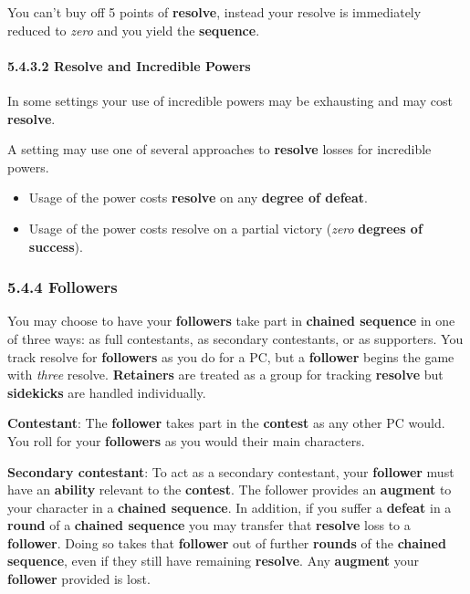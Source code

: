 \documentclass[
  11pt,
]{article}
\providecommand{\tightlist}{%
  \setlength{\itemsep}{0pt}\setlength{\parskip}{0pt}}
\begin{document}
You can't buy off 5 points of \textbf{resolve}, instead your resolve is
immediately reduced to \emph{zero} and you yield the \textbf{sequence}.

\hypertarget{resolve-and-incredible-powers}{%
\paragraph{5.4.3.2 Resolve and Incredible
Powers}\label{resolve-and-incredible-powers}}

In some settings your use of incredible powers may be exhausting and may
cost \textbf{resolve}.

A setting may use one of several approaches to \textbf{resolve} losses
for incredible powers.

\begin{itemize}
\tightlist
\item
  Usage of the power costs \textbf{resolve} on any \textbf{degree of
  defeat}.
\item
  Usage of the power costs resolve on a partial victory (\emph{zero}
  \textbf{degrees of success}).
\end{itemize}

\hypertarget{followers-1}{%
\subsubsection{5.4.4 Followers}\label{followers-1}}

You may choose to have your \textbf{followers} take part in
\textbf{chained sequence} in one of three ways: as full contestants, as
secondary contestants, or as supporters. You track resolve for
\textbf{followers} as you do for a PC, but a \textbf{follower} begins
the game with \emph{three} resolve. \textbf{Retainers} are treated as a
group for tracking \textbf{resolve} but \textbf{sidekicks} are handled
individually.

\textbf{Contestant}: The \textbf{follower} takes part in the
\textbf{contest} as any other PC would. You roll for your
\textbf{followers} as you would their main characters.

\textbf{Secondary contestant}: To act as a secondary contestant, your
\textbf{follower} must have an \textbf{ability} relevant to the
\textbf{contest}. The follower provides an \textbf{augment} to your
character in a \textbf{chained sequence}. In addition, if you suffer a
\textbf{defeat} in a \textbf{round} of a \textbf{chained sequence} you
may transfer that \textbf{resolve} loss to a \textbf{follower}. Doing so
takes that \textbf{follower} out of further \textbf{rounds} of the
\textbf{chained sequence}, even if they still have remaining
\textbf{resolve}. Any \textbf{augment} your \textbf{follower} provided
is lost.
\end{document}
